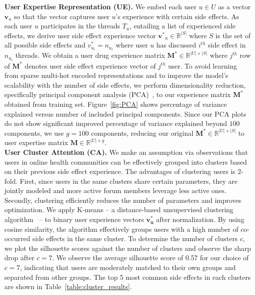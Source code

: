 \documentclass{bmcart}
\begin{document}
\textbf{User Expertise Representation (UE).}  We embed each user $u
\in U$ as a vector $\boldsymbol{v}_{u}$ so that the vector captures
user $u$'s experience with certain side effects. As each user $u$
participates in the threads $T_u$, entailing a list of experienced
side effects, we derive user side effect experience vector $\boldsymbol{v^{\ast}}_{u}
\in \mathbb{R}^{|S|}$ where $S$ is the set of all possible side effects and
$v^{\ast}_{u_i}=n_{u_i}$ where user $u$ has discussed $i^{th}$ side effect in $n_{u_i}$ threads. We obtain a user drug experience matrix
$\boldsymbol{M}^{\ast} \in \mathbb{R}^{|U|\times|S|}$ where $j^{th}$
row of $\boldsymbol{M}^{\ast}$ denotes user side effect experience vector of $j^{th}$ user. To avoid learning from sparse multi-hot encoded representations and to improve the model's scalability with the number of side effects, we perform  dimensionality reduction, specifically principal component analysis (PCA)~\cite{jolliffe1986principal}, to our experience matrix $\boldsymbol{M}^{\ast}$ obtained from training set.
Figure~\ref{fig:PCA} shows percentage of variance explained versus
number of included principal components. Since our PCA plots do not show significant improved percentage of variance explained beyond $100$ components, we use $g=100$ components, reducing
our original $\boldsymbol{M}^{\ast}\in \mathbb{R}^{|U|\times|S|}$ to
user expertise matrix $\boldsymbol{M} \in \mathbb{R}^{|U| \times g}$. \\

\textbf{User Cluster Attention (CA).} We make an assumption via observations that users in online health communities can be effectively grouped into clusters based on their previous side effect experience. The advantages of clustering users is 2-fold. First, since users in the same clusters share certain parameters, they are jointly modeled and more active forum members leverage less active ones. Secondly, clustering efficiently reduces the number of parameters and improves optimization. We apply K-means -- a distance-based unsupervised clustering algorithm~\cite{MacQueen67} -- to binary user experience vectors $\boldsymbol{v^*_u}$ after normalization. 
By using cosine similarity, 
the algorithm effectively groups users with a high number of co-occurred side effects in the same cluster. To determine the number of clusters $c$, we plot the silhouette scores against the number of clusters and %
observe the sharp drop after $c=7$. 
We observe the average silhouette score of 0.57 for our choice of $c=7$, indicating that users are moderately matched to their own groups and separated from other groups. The top 5 most common side effects in each clusters are shown in Table~\ref{table:cluster_results}.
\end{document}
